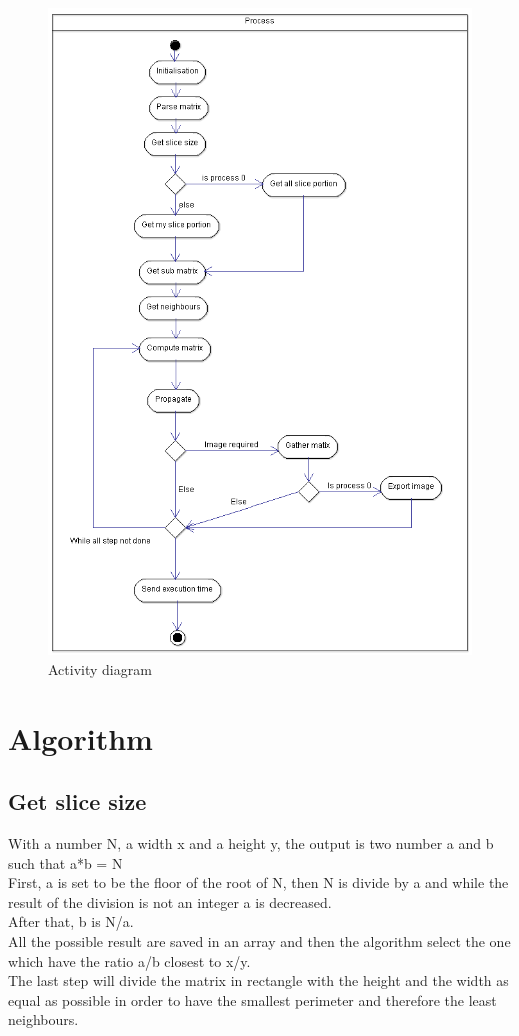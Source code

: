 \documentclass[a4paper,12pt]{article}
\begin{document}
\begin{center}
	\begin{figure}[!h]
		\includegraphics[scale=0.8]{activity.png}
		\caption{Activity diagram}
		\label{Activity diagram}
	\end{figure}
\end{center}

\section{Algorithm}
\subsection{Get slice size}
With a number N, a width x and a height y, the output is two number a and b such that a*b = N\\
First, a is set to be the floor of the root of N, then N is divide by a and while the result of the division is not an integer a is decreased.\\
After that, b is N/a.\\
All the possible result are saved in an array and then the algorithm select the one which have the ratio a/b closest to x/y.\\
The last step will divide the matrix in rectangle with the height and the width as equal as possible in order to have the smallest perimeter and therefore the least neighbours.
\end{document}
